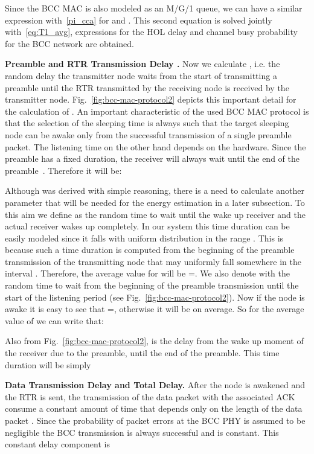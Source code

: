 \documentclass[10pt]{IEEEtran}
\newcounter{section:outage-analysis}
\begin{document}
Since the BCC MAC is also modeled as an M/G/1 queue, we can have a similar expression with~\eqref{pi_cca} for  and . This second equation is solved jointly with~\eqref{eq:T1_avg}, expressions for the HOL delay and channel busy probability  for the BCC network are obtained.

\textbf{Preamble and RTR Transmission Delay .} Now we calculate , i.e. the random delay the transmitter node waits from the start of transmitting a preamble until the RTR transmitted by the receiving node is received by the transmitter node. Fig.~\ref{fig:bcc-mac-protocol2} depicts this important detail for the calculation of . An important characteristic of the used BCC MAC protocol is that the selection of the sleeping time  is always such that the target sleeping node can be awake only from the successful transmission of a single preamble packet. The listening time  on the other hand depends on the hardware. Since the preamble has a fixed duration, the receiver will always wait until the end of the preamble~\cite{buettner06}. Therefore it will be:

Although  was derived with simple reasoning, there is a need to calculate another parameter that will be needed for the energy estimation in a later subsection. To this aim we define as  the random time to wait until the wake up receiver and the actual receiver wakes up completely. In our system this time duration can be easily modeled since it falls with uniform distribution in the range . This is because such a time duration is computed from the beginning of the preamble transmission of the transmitting node that may uniformly fall somewhere in the interval . Therefore, the average value for  will be =. We also denote with  the random time to wait from the beginning of the preamble transmission until the start of the listening period (see Fig.~\ref{fig:bcc-mac-protocol2}). Now if the node is awake it is easy to see that =, otherwise it will be  on average. So for the average value of  we can write that:

Also from Fig.~\ref{fig:bcc-mac-protocol2},  is the delay from the wake up moment of the receiver due to the preamble, until the end of the preamble. This time duration will be simply


\textbf{Data Transmission Delay  and Total Delay.} After the node is awakened and the RTR is sent, the transmission of the data packet with the associated ACK consume a constant amount of time that depends only on the length of the data packet . Since the probability of packet errors at the BCC PHY is assumed to be negligible the BCC transmission is always successful and  is constant. This constant delay component is
\end{document}
